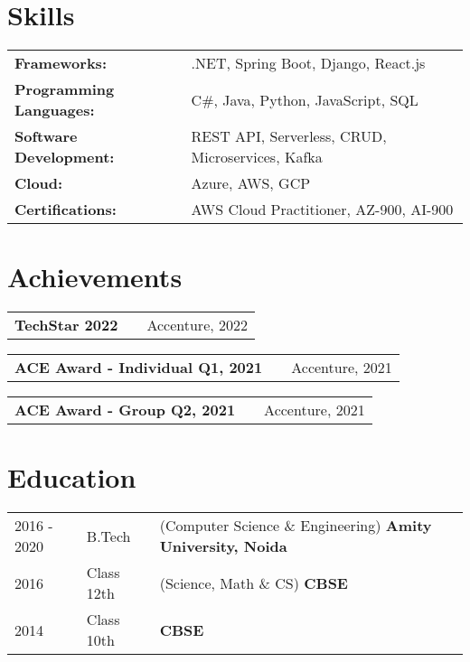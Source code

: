\documentclass[a4paper,12pt]{article}
\makeatletter
\newenvironment{jobshort}[2]
    {
    \begin{tabularx}{\linewidth}{@{}l X r@{}}
    \textbf{#1} & \hfill &  #2 \\[3.75pt]
    \end{tabularx}
    }
    {
    }
\makeatother
\begin{document}
\section{Skills}
\begin{tabularx}{\linewidth}{@{}l X@{}}
\textbf{Frameworks:} & \hfill \normalsize{.NET, Spring Boot, Django, React.js}\\
\textbf{Programming Languages:} & \hfill \normalsize{C\#, Java, Python, JavaScript, SQL}\\
\textbf{Software Development:} & \hfill \normalsize{REST API, Serverless, CRUD, Microservices, Kafka}\\
\textbf{Cloud:} & \hfill \normalsize{Azure, AWS, GCP}\\
\textbf{Certifications:} & \hfill \normalsize{AWS Cloud Practitioner, AZ-900, AI-900}
\end{tabularx}

\section{Achievements}
\begin{jobshort}{TechStar 2022} {Accenture, 2022}\end{jobshort}
\begin{jobshort}{ACE Award - Individual Q1, 2021} {Accenture, 2021}\end{jobshort}
\begin{jobshort}{ACE Award - Group Q2, 2021} {Accenture, 2021}\end{jobshort}

\section{Education}
\begin{tabularx}{\linewidth}{@{}l l X@{}}	

2016 - 2020 & B.Tech & (Computer Science \& Engineering) \hfill \textbf{Amity University, Noida} \\ 

2016 & Class 12th & (Science, Math \& CS) \hfill \textbf{CBSE} \\ 

2014 & Class 10th &  \hfill \textbf{CBSE} \\ 
\end{tabularx}
\end{document}
